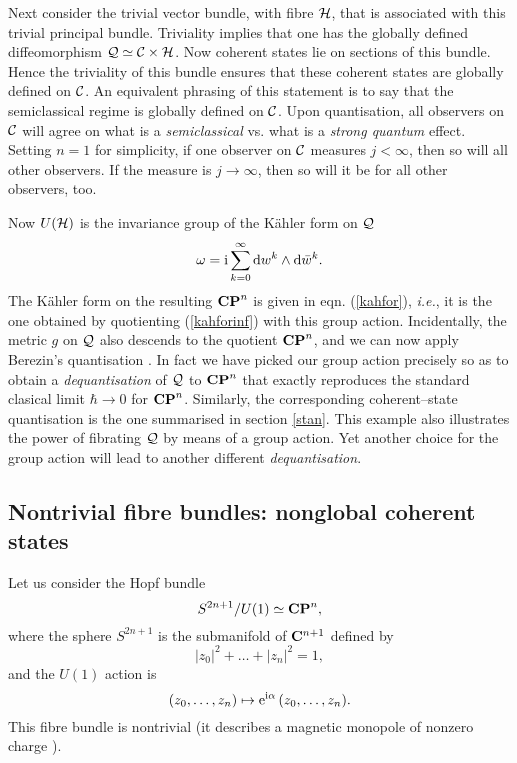 \documentclass[a4paper,a4paper]{article}
\begin{document}
Next consider the trivial vector bundle, with fibre ${\cal H}$,
that is associated with this trivial principal bundle. Triviality 
implies that one has the globally defined diffeomorphism 
${\cal Q}\simeq {\cal C}\times {\cal H}$.
Now coherent states lie on sections of this bundle.  
Hence the triviality of this bundle ensures that these coherent states 
are globally defined on ${\cal C}$. An equivalent phrasing of this statement 
is to say that the semiclassical regime is globally defined on ${\cal C}$. 
Upon quantisation, all observers on ${\cal C}$ will agree on 
what is a {\it semiclassical} vs. what is a {\it strong quantum} effect. 
Setting $n=1$ for simplicity, if one observer on ${\cal C}$ measures 
$j<\infty$, then so will all other observers. If the measure 
is $j\to\infty$, then so will it be for all other observers, too.

Now $U({\cal H})$ is the invariance group of the K\"ahler form on ${\cal Q}$
\begin{equation}
\omega={\rm i}\sum_{k=0}^{\infty}{\rm d} w^k\wedge {\rm d}\bar w^k.
\label{kahforinf}
\end{equation}
The K\"ahler form on the resulting ${\bf CP}^n$ is given in eqn. (\ref{kahfor}), 
{\it i.e.}, it is the one obtained by quotienting (\ref{kahforinf}) with this group action.
Incidentally, the metric $g$ on ${\cal Q}$ also descends to the quotient ${\bf CP}^n$,
and we can now apply Berezin's quantisation \cite{BEREZIN}. In fact we have
picked our group action precisely so as to obtain a {\it dequantisation} 
of ${\cal Q}$ to ${\bf CP}^n$ that exactly reproduces the standard clasical limit 
$\hbar \to 0$ for ${\bf CP}^n$.  Similarly, the corresponding coherent--state quantisation
\cite{PERELOMOV} is the one summarised in section \ref{stan}. This example also 
illustrates the power of fibrating ${\cal Q}$ by means of a group action. 
Yet another choice for the group action will lead to another different {\it dequantisation}.
       
\subsection{Nontrivial fibre bundles: nonglobal coherent states }\label{quatriexam}

Let us consider the Hopf bundle
\begin{equation}
S^{2n+1}/U(1)\simeq {\bf CP}^n,
\label{hopf}
\end{equation}
where the sphere $S^{2n+1}$ is the submanifold of ${\bf C}^{n+1}$ defined by
\begin{equation}
|z_0|^2 + \ldots + |z_n|^2=1,
\label{sphere}
\end{equation}
and the $U(1)$ action is 
\begin{equation}
(z_0,\ldots, z_n)\mapsto {\rm e}^{{\rm i}\alpha}\,(z_0,\ldots, z_n).
\label{maphopf}
\end{equation}
This fibre bundle is nontrivial \cite{TOPPHYS} (it describes a magnetic monopole 
of nonzero charge \cite{QFTT}). 
\end{document}
